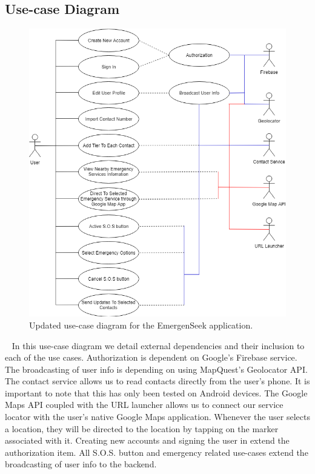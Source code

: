 \documentclass[10pt, a4paper]{article}
\begin{document}
\subsection{Use-case Diagram}
\begin{figure}[H]
\begin{center}
\centerline{
	\includegraphics[scale=.6]{final-diagrams/Revised_Use_Case_Diagram.png}
}
\caption{Updated use-case diagram for the EmergenSeek application.}
\end{center}	
\end{figure}
\par ~ In this use-case diagram we detail external dependencies and their inclusion to each of the use cases. Authorization is dependent on Google's Firebase service. The broadcasting of user info is depending on using MapQuest's Geolocator API. The contact service allows us to read contacts directly from the user's phone. It is important to note that this has only been tested on Android devices. The Google Maps API coupled with the URL launcher allows us to connect our service locator with the user's native Google Maps application. Whenever the user selects a location, they will be directed to the location by tapping on the marker associated with it. Creating new accounts and signing the user in extend the authorization item. All S.O.S. button and emergency related use-cases extend the broadcasting of user info to the backend. 
\end{document}
